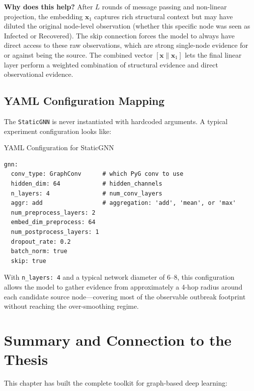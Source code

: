 \textbf{Why does this help?} After $L$ rounds of message passing and non-linear projection, the embedding $\mathbf{x}_1$ captures rich structural context but may have diluted the original node-level observation (whether this specific node was seen as Infected or Recovered). The skip connection forces the model to always have direct access to these raw observations, which are strong single-node evidence for or against being the source. The combined vector $[\mathbf{x} \| \mathbf{x}_1]$ lets the final linear layer perform a weighted combination of structural evidence and direct observational evidence.

\subsection{YAML Configuration Mapping}

The \texttt{StaticGNN} is never instantiated with hardcoded arguments. A typical experiment configuration looks like:

\begin{codewalk}{YAML Configuration for StaticGNN}
\begin{lstlisting}[language={}]
gnn:
  conv_type: GraphConv      # which PyG conv to use
  hidden_dim: 64            # hidden_channels
  n_layers: 4               # num_conv_layers
  aggr: add                 # aggregation: 'add', 'mean', or 'max'
  num_preprocess_layers: 2
  embed_dim_preprocess: 64
  num_postprocess_layers: 1
  dropout_rate: 0.2
  batch_norm: true
  skip: true
\end{lstlisting}
With \texttt{n\_layers: 4} and a typical network diameter of 6--8, this configuration allows the model to gather evidence from approximately a 4-hop radius around each candidate source node---covering most of the observable outbreak footprint without reaching the over-smoothing regime.
\end{codewalk}

\section{Summary and Connection to the Thesis}

This chapter has built the complete toolkit for graph-based deep learning:

